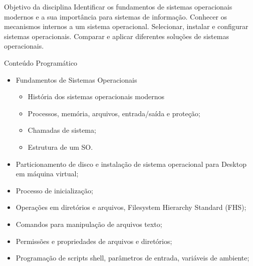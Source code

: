 \documentclass{beamer}
\begin{document}
\begin{frame}{Objetivo da disciplina}\justifying
      Identificar os fundamentos de sistemas operacionais modernos e a sua importância para
sistemas de informação. Conhecer os mecanismos internos a um sistema operacional.
Selecionar, instalar e configurar sistemas operacionais. Comparar e aplicar diferentes
soluções de sistemas operacionais.
\end{frame}

\begin{frame}[fragile]{Conteúdo Programático}

\begin{itemize}
      \item Fundamentos de Sistemas Operacionais
      \begin{itemize}
            \item História dos sistemas operacionais modernos
            \item Processos, memória, arquivos, entrada/saída e proteção;
            \item Chamadas de sistema;
            \item Estrutura de um SO.
      \end{itemize}
      \item Particionamento de disco e instalação de sistema operacional para Desktop em
      máquina virtual;
      \item Processo de inicialização;
      \item Operações em diretórios e arquivos, Filesystem Hierarchy Standard (FHS);
      \item Comandos para manipulação de arquivos texto;
      \item Permissões e propriedades de arquivos e diretórios;
      \item Programação de scripts shell, parâmetros de entrada, variáveis de ambiente;
    
\end{itemize}
\end{frame}
\end{document}
